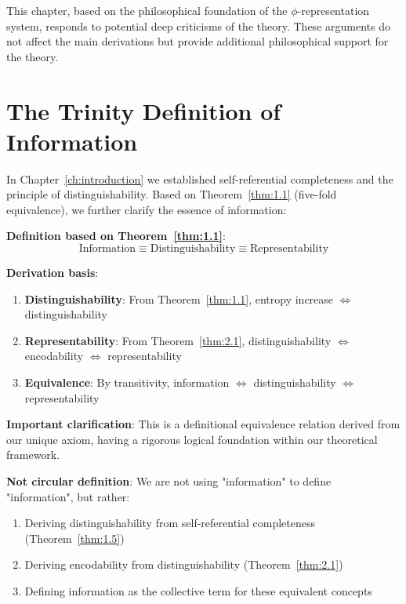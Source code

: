
This chapter, based on the philosophical foundation of the $\phi$-representation system, responds to potential deep criticisms of the theory. These arguments do not affect the main derivations but provide additional philosophical support for the theory.

\section{The Trinity Definition of Information}
\label{sec:ch09_defense:the-trinity-definition-of-information}

In Chapter~\ref{ch:introduction} we established self-referential completeness and the principle of distinguishability. Based on Theorem~\ref{thm:1.1} (five-fold equivalence), we further clarify the essence of information:

\textbf{Definition based on Theorem~\ref{thm:1.1}}:
\begin{equation}
\boxed{\text{Information} \equiv \text{Distinguishability} \equiv \text{Representability}}
\end{equation}

\textbf{Derivation basis}:
\begin{enumerate}
\item \textbf{Distinguishability}: From Theorem~\ref{thm:1.1}, entropy increase $\Leftrightarrow$ distinguishability
\item \textbf{Representability}: From Theorem~\ref{thm:2.1}, distinguishability $\Leftrightarrow$ encodability $\Leftrightarrow$ representability
\item \textbf{Equivalence}: By transitivity, information $\Leftrightarrow$ distinguishability $\Leftrightarrow$ representability
\end{enumerate}

\textbf{Important clarification}: This is a definitional equivalence relation derived from our unique axiom, having a rigorous logical foundation within our theoretical framework.

\textbf{Not circular definition}: We are not using "information" to define "information", but rather:
\begin{enumerate}
\item Deriving distinguishability from self-referential completeness (Theorem~\ref{thm:1.5})
\item Deriving encodability from distinguishability (Theorem~\ref{thm:2.1})
\item Defining information as the collective term for these equivalent concepts
\end{enumerate}

